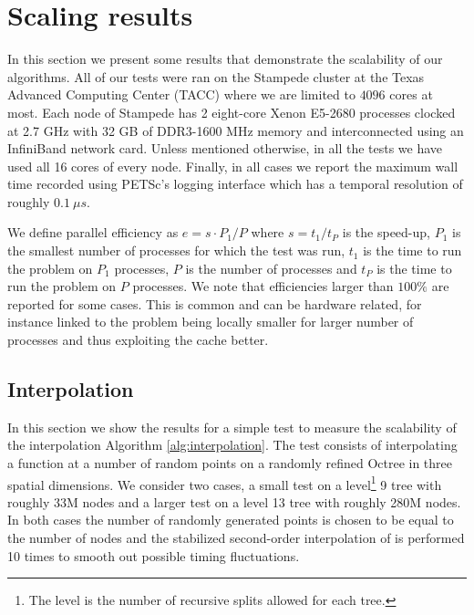 \section{Scaling results} \label{sec:scaling}
In this section we present some results that demonstrate the scalability of our algorithms. All of our tests were ran on the Stampede cluster at the Texas Advanced Computing Center (TACC) where we are limited to $4096$ cores at most. Each node of Stampede has 2 eight-core Xenon E5-2680 processes clocked at 2.7 GHz with 32 GB of DDR3-1600 MHz memory and interconnected using an InfiniBand network card. Unless mentioned otherwise, in all the tests we have used all 16 cores of every node. Finally, in all cases we report the maximum wall time recorded using PETSc's logging interface which has a temporal resolution of roughly $0.1 \: \mu s$.

We define parallel efficiency as $e=s\cdot P_1 / P$ where $s=t_1/t_P$ is the speed-up, $P_1$ is the smallest number of processes for which the test was run, $t_1$ is the time to run the problem on $P_1$ processes, $P$ is the number of processes and $t_P$ is the time to run the problem on $P$ processes. We note that efficiencies larger than $100\%$ are reported for some cases. This is common and can be hardware related, for instance linked to the problem being locally smaller for larger number of processes and thus exploiting the cache better.

\subsection{Interpolation}
In this section we show the results for a simple test to measure the scalability of the interpolation Algorithm \ref{alg:interpolation}. The test consists of interpolating a function at a number of random points on a randomly refined Octree in three spatial dimensions. We consider two cases, a small test on a level\footnote{The level is the number of recursive splits allowed for each tree.} 9 tree with roughly 33M nodes and a larger test on a level 13 tree with roughly 280M nodes. In both cases the number of randomly generated points is chosen to be equal to the number of nodes and the stabilized second-order interpolation of \cite{Min;Gibou:07:A-second-order-accur} is performed 10 times to smooth out possible timing fluctuations.

